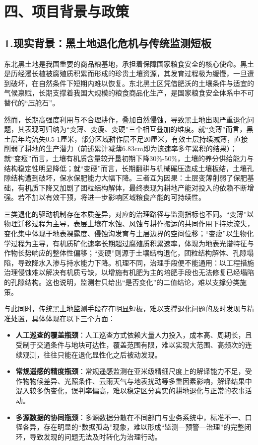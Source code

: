 \documentclass[12pt, a4paper]{ctexart}
\begin{document}
\section{四、项目背景与政策}

\subsection{1.现实背景：黑土地退化危机与传统监测短板}

东北黑土地是我国重要的商品粮基地，承担着保障国家粮食安全的核心使命。黑土是历经漫长植被腐殖质积累而形成的珍贵土壤资源，其发育过程极为缓慢，一旦遭到破坏，在自然条件下短期内难以恢复。东北黑土区凭借肥沃的土壤条件与适宜的气候禀赋，长期支撑着我国大规模的粮食商品化生产，是国家粮食安全体系中不可替代的“压舱石”。

然而，长期高强度利用与不合理耕作，叠加自然侵蚀，导致黑土地出现严重退化问题，其表现可归纳为“变薄、变瘦、变硬”三个相互叠加的维度。就“变薄”而言，黑土层年均流失0.5-1厘米，部分区域耕作层不足20厘米，有效土层持续减薄，直接削弱了耕地的生产潜力（前述累计减薄6.83cm即为该速率多年累积的结果）；就“变瘦”而言，土壤有机质含量较开垦初期下降30\%-50\%，土壤的养分供给能力与结构稳定性明显降低；就“变硬”而言，长期翻耕与机械碾压造成土壤板结，土壤孔隙结构遭到破坏，保水保肥能力大幅下降。三者互为因果：土层变薄削弱了保肥基础，有机质下降又加剧了团粒结构解体，最终表现为耕地产能对投入的依赖不断增强。若不加以有效干预，将进一步影响区域粮食产能的可持续性。

三类退化的驱动机制存在本质差异，对应的治理路径与监测指标也不同。“变薄”以物理迁移过程为主导，表层土壤在水蚀、风蚀与耕作搬运的共同作用下持续流失，变化集中体现于地表裸露度、侵蚀沟发育与土层边界的空间位移；“变瘦”以生物化学过程为主导，有机质矿化速率长期超过腐殖质积累速率，体现为地表光谱特征与作物长势响应的整体性偏移；“变硬”则源于土壤结构退化，团粒结构解体、孔隙塌陷，导致降水入渗与持水能力下降。机理不同，治理手段便不能通用：以工程措施治理侵蚀难以解决有机质亏缺，以增施有机肥为主的培肥手段也无法修复已经塌陷的孔隙结构。这也说明，监测若只给出“是否变化”的二值结论，难以支撑分类施策。

与此同时，传统黑土地监测手段存在明显短板，难以支撑退化问题的及时发现与精准处置，具体体现在以下三个方面：

\begin{itemize}
    \item \textbf{人工巡查的覆盖瓶颈}：人工巡查方式依赖大量人力投入，成本高、周期长，且受制于交通条件与地块可达性，覆盖范围有限，难以实现大范围、高频次的连续观测，往往只能在退化显性化之后被动发现。
    \item \textbf{常规遥感的精度瓶颈}：常规遥感监测在亚米级精细尺度上的解译能力不足，受作物物候差异、光照条件、云雨天气与地表扰动等多重因素影响，解译结果中混入较多伪变化，误判率偏高，难以稳定区分真实的耕地退化与正常的农事活动。
    \item \textbf{多源数据的协同瓶颈}：多源数据分散在不同部门与业务系统中，标准不一、口径各异，存在明显的“数据孤岛”现象，难以形成“监测—预警—治理”的完整闭环，导致发现的问题无法及时转化为治理行动。
\end{itemize}
\end{document}
